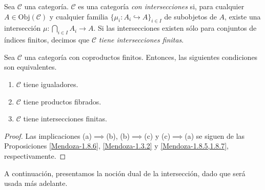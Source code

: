 \documentclass[tesis]{subfiles}
\begin{document}
\begin{Def}
    Sea $\mathscr{C}$ una categoría. $\mathscr{C}$ es una categoría \emph{con intersecciones} si, para cualquier $A\in\text{Obj}(\mathscr{C})$ y cualquier familia $\{\mu_i:A_i\hookrightarrow A\}_{i\in I}$ de subobjetos de $A$, existe una intersección $\mu: \bigcap_{i\in I}A_i\to A$. Si las intersecciones existen sólo para conjuntos de índices finitos, decimos que $\mathscr{C}$ \emph{tiene intersecciones finitas}.
\end{Def}

\begin{Teo}\label{Mendoza-1.8.8}
    Sea $\mathscr{C}$ una categoría con coproductos finitos. Entonces, las siguientes condiciones son equivalentes.

    \begin{enumerate}[label=(\alph*)]
    
        \item $\mathscr{C}$ tiene igualadores.

        \item $\mathscr{C}$ tiene productos fibrados.

        \item $\mathscr{C}$ tiene intersecciones finitas.
    \end{enumerate}
\end{Teo}

\begin{proof}

    Las implicaciones (a)$\implies$(b), (b)$\implies$(c) y (c)$\implies$(a) se siguen de las Proposiciones \ref{Mendoza-1.8.6}, \ref{Mendoza-1.3.2} y \ref{Mendoza-1.8.5,1.8.7}, respectivamente.
\end{proof}

A continuación, presentamos la noción dual de la intersección, dado que será usada más adelante.
\end{document}
